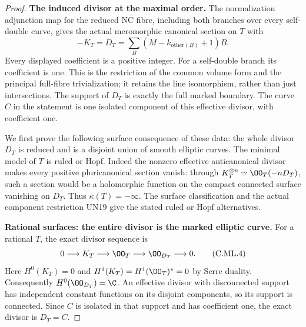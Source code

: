 \begin{proof}
\par\medskip\noindent\textbf{The induced divisor at the maximal order.}
The normalization adjunction map for the reduced NC
fibre, including both branches over every self-double
curve, gives the actual meromorphic canonical section
on \(T\) with
\[
      -K_T=D_T=\sum_B (M-k_{\mathrm{other}(B)}+1)B.
\tag{C.ML.3}
\]
Every displayed coefficient is a positive integer.
For a self-double branch its coefficient is one.
This is the restriction of the common volume form and
the principal full-fibre trivialization; it retains
the line isomorphism, rather than just intersections.
The support of \(D_T\) is exactly the full marked
boundary. The curve \(C\) in the statement is one
isolated component of this effective divisor, with
coefficient one.

We first prove the following surface consequence of
these data: the whole divisor \(D_T\) is reduced and
is a disjoint union of smooth elliptic curves. The
minimal model of \(T\) is ruled or Hopf. Indeed the
nonzero effective anticanonical divisor makes every
positive pluricanonical section vanish: through
\(K_T^{\otimes n}\simeq\OO_T(-nD_T)\), such a
section would be a holomorphic function on the compact
connected surface vanishing on \(D_T\). Thus
\(\kappa(T)=-\infty\). The surface classification
and the actual component restriction UN19 give the
stated ruled or Hopf alternatives.

\par\medskip\noindent\textbf{Rational surfaces: the entire divisor is the marked elliptic curve.}
For a rational \(T\), the exact divisor sequence is
\[
 0\longrightarrow K_T\longrightarrow\OO_T
          \longrightarrow\OO_{D_T}\longrightarrow0.
\tag{C.ML.4}
\]
Here \(H^0(K_T)=0\) and
\(H^1(K_T)=H^1(\OO_T)^*=0\) by Serre duality.
Consequently \(H^0(\OO_{D_T})=\C\). An effective
divisor with disconnected support has independent
constant functions on its disjoint components, so
its support is connected. Since \(C\) is isolated
in that support and has coefficient one, the exact
divisor is \(D_T=C\).


\end{proof}
